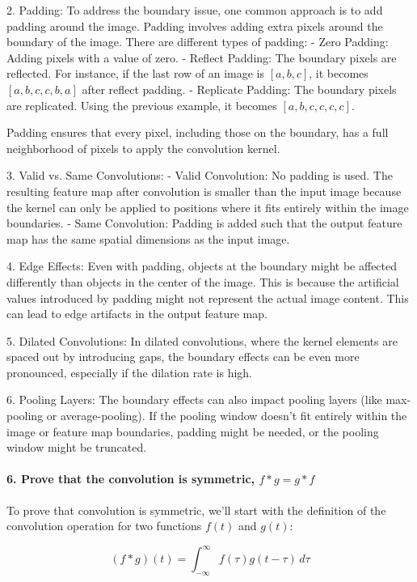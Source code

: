 2. Padding: To address the boundary issue, one common approach is to add padding around the image. Padding involves adding extra pixels around the boundary of the image. There are different types of padding:
   - Zero Padding: Adding pixels with a value of zero.
   - Reflect Padding: The boundary pixels are reflected. For instance, if the last row of an image is \([a, b, c]\), it becomes \([a, b, c, c, b, a]\) after reflect padding.
   - Replicate Padding: The boundary pixels are replicated. Using the previous example, it becomes \([a, b, c, c, c, c]\).

   Padding ensures that every pixel, including those on the boundary, has a full neighborhood of pixels to apply the convolution kernel.

3. Valid vs. Same Convolutions:
   - Valid Convolution: No padding is used. The resulting feature map after convolution is smaller than the input image because the kernel can only be applied to positions where it fits entirely within the image boundaries.
   - Same Convolution: Padding is added such that the output feature map has the same spatial dimensions as the input image.

4. Edge Effects: Even with padding, objects at the boundary might be affected differently than objects in the center of the image. This is because the artificial values introduced by padding might not represent the actual image content. This can lead to edge artifacts in the output feature map.

5. Dilated Convolutions: In dilated convolutions, where the kernel elements are spaced out by introducing gaps, the boundary effects can be even more pronounced, especially if the dilation rate is high.

6. Pooling Layers: The boundary effects can also impact pooling layers (like max-pooling or average-pooling). If the pooling window doesn't fit entirely within the image or feature map boundaries, padding might be needed, or the pooling window might be truncated.

\paragraph{6. Prove that the convolution is symmetric, \(f * g = g * f\)}

To prove that convolution is symmetric, we'll start with the definition of the convolution operation for two functions \( f(t) \) and \( g(t) \):

\[ (f * g)(t) = \int_{-\infty}^{\infty} f(\tau) g(t - \tau) \, d\tau \]

